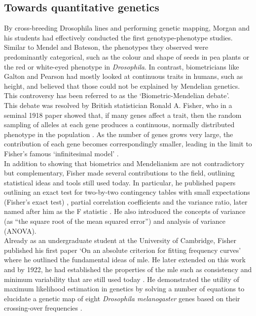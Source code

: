 \subsection{Towards quantitative genetics} %
\label{sec:Fisher}

By cross-breeding Drosophila lines and performing genetic mapping, Morgan and his students had effectively conducted the first genotype-phenotype studies. 
Similar to Mendel and Bateson, the phenotypes they observed were predominantly categorical, such as the colour and shape of seeds in pea plants or the red or white-eyed phenotype in \textit{Drosophila}. 
In contrast, biometricians like Galton and Pearson had mostly looked at continuous traits in humans, such as height, and believed that those could not be explained by Mendelian genetics.
This controversy has been referred to as the `Biometric-Mendelian debate'.\\ 

This debate was resolved by British statistician Ronald A. Fisher, who in a seminal 1918 paper showed that, if many genes affect a trait, then the random sampling of alleles at each gene produces a continuous, normally distributed phenotype in the population \cite{fisher1919xv}. 
As the number of genes grows very large, the contribution of each gene becomes correspondingly smaller, leading in the limit to Fisher’s famous `infinitesimal model' \cite{barton2017infinitesimal}.\\

In addition to showing that biometrics and Mendelianism are not contradictory but complementary, Fisher made several contributions to the field, outlining statistical ideas and tools still used today. 
In particular, he published papers outlining an exact test for two-by-two contingency tables with small expectations (Fisher’s exact test) \cite{fisher1922interpretation}, partial correlation coefficients \cite{fisher1924distribution} and the variance ratio, later named after him as the F statistic \cite{fisher1924036}. 
He also introduced the concepts of variance (as “the square root of the mean squared error”) and analysis of variance (ANOVA). \\

Already as an undergraduate student at the University of Cambridge, Fisher published his first paper `On an absolute criterion for fitting frequency curves' where he outlined the fundamental ideas of \gls{mle}. 
He later extended on this work and by 1922, he had established the properties of the \gls{mle} such as consistency and minimum variability \cite{fisher1922mathematical} that are still used today \cite{hald1999history}. 
He demonstrated the utility of maximum likelihood estimation in genetics by solving a number of equations to elucidate a genetic map of eight \textit{Drosophila melanogaster} genes based on their crossing-over frequencies \cite{fisher1922systematic}.\\

